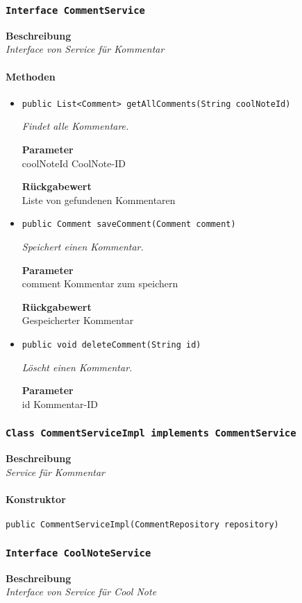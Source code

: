     \subsubsection{\texttt{Interface CommentService}}
    \textbf{Beschreibung} \\
    \textit{Interface von Service für Kommentar}
    \paragraph*{Methoden}
    \begin{itemize}
    	\item{\texttt{public List<Comment> getAllComments(String coolNoteId)}}
    	
    	\textit{Findet alle Kommentare.}
    	
    	\textbf{Parameter} \\
    	coolNoteId CoolNote-ID
    	
    	\textbf{Rückgabewert} \\
    	Liste von gefundenen Kommentaren        \item{\texttt{public Comment saveComment(Comment comment)}}
    	
    	\textit{Speichert einen Kommentar.}
    	
    	\textbf{Parameter} \\
    	comment Kommentar zum speichern
    	
    	\textbf{Rückgabewert} \\
    	Gespeicherter Kommentar        \item{\texttt{public void deleteComment(String id)}}
    	
    	\textit{Löscht einen Kommentar.}
    	
    	\textbf{Parameter} \\
    	id Kommentar-ID
    	
    	
    \end{itemize}
    \subsubsection{\texttt{Class CommentServiceImpl implements CommentService}}
    \textbf{Beschreibung} \\
    \textit{Service für Kommentar}
    \paragraph*{Konstruktor}
    \texttt{public CommentServiceImpl(CommentRepository repository)}
    \subsubsection{\texttt{Interface CoolNoteService}}
    \textbf{Beschreibung} \\
    \textit{Interface von Service für Cool Note}
